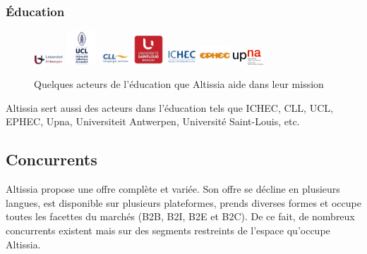 \subsubsection{Éducation}
\begin{figure}[ht]
    \centering
    \includegraphics[width=0.1\textwidth]{images/education/u-antwerpen-logo.jpeg}
    \includegraphics[width=0.1\textwidth]{images/education/ucl-logo.jpeg}
    \includegraphics[width=0.1\textwidth]{images/education/cll-logo.jpeg}
    \includegraphics[width=0.1\textwidth]{images/education/u-st-louis-logo.jpeg}
    \includegraphics[width=0.1\textwidth]{images/education/ichec-logo.png}
    \includegraphics[width=0.1\textwidth]{images/education/ephec-logo.jpeg}
    \includegraphics[width=0.1\textwidth]{images/education/uppna-logo.png}
    \caption{Quelques acteurs de l'éducation que Altissia aide dans leur mission}
    \label{fig:educations-logo}
\end{figure}
Altissia sert aussi des acteurs dans l'éducation tels que ICHEC, CLL, UCL, EPHEC, Upna, Universiteit Antwerpen, Université Saint-Louis, etc.

\subsection{Concurrents}
Altissia propose une offre complète et variée. Son offre se décline en plusieurs langues, est disponible sur plusieurs plateformes, prends diverses formes et occupe toutes les facettes du marchés (B2B, B2I, B2E et B2C).
De ce fait, de nombreux concurrents existent mais sur des segments restreints de l'espace qu'occupe Altissia.

